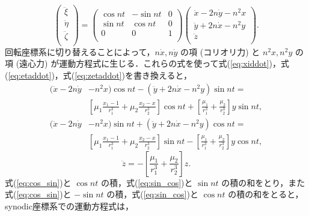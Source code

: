 \documentclass[11pt,a4paper,oneside,onecolumn]{jreport}
\begin{document}
\begin{equation}
\begin{pmatrix}
\ddot{\xi}\\
\ddot{\eta}\\
\ddot{\zeta}\\
\end{pmatrix}
= 
\begin{pmatrix}
\cos nt & - \sin nt & 0\\
\sin nt & \cos nt & 0\\
0 & 0 & 1\\
\end{pmatrix}
\begin{pmatrix}
\ddot{x} - 2 n \dot{y} - n^2 x\\
\ddot{y} + 2 n \dot{x} - n^2 y\\
\ddot{z}\\
\end{pmatrix}. \label{eq:xiddot_etaddot_zetaddot}
\end{equation}
回転座標系に切り替えることによって，$n \dot{x}, n \dot{y}$ の項 (コリオリ力) と $n^2 x, n^2 y$ の項 (遠心力) が運動方程式に生じる．これらの式を使って式(\ref{eq:xiddot})，式(\ref{eq:etaddot})，式(\ref{eq:zetaddot})を書き換えると，
\begin{equation}
\begin{split}
(\ddot{x} - 2 n \dot{y} & - n^2 x) \cos nt - (\ddot{y} + 2 n \dot{x} - n^2 y) \sin nt =\\
& \left[ \mu_1 \frac{x_1 - 1}{r_1^3} + \mu_2 \frac{x_2 - x}{r_2^3} \right] \cos nt + \left[ \frac{\mu_1}{r_1^3} + \frac{\mu_2}{r_2^3} \right] y \sin nt, \label{eq:cos_sin}
\end{split}
\end{equation}
\begin{equation}
\begin{split}
(\ddot{x} - 2 n \dot{y} & - n^2 x) \sin nt + (\ddot{y} + 2 n \dot{x} - n^2 y) \cos nt =\\
& \left[ \mu_1 \frac{x_1 - 1}{r_1^3} + \mu_2 \frac{x_2 - x}{r_2^3} \right] \sin nt - \left[ \frac{\mu_1}{r_1^3} + \frac{\mu_2}{r_2^3} \right] y \cos nt, \label{eq:sin_cos}
\end{split}
\end{equation}
\begin{equation}
\ddot{z} = - \left[ \frac{\mu_1}{r_1^3} + \frac{\mu_2}{r_2^3} \right] z.
\end{equation}
式(\ref{eq:cos_sin})と $\cos nt$ の積，式(\ref{eq:sin_cos})と $\sin nt$ の積の和をとり，また式(\ref{eq:cos_sin})と $- \sin nt$ の積，式(\ref{eq:sin_cos})と $\cos nt$ の積の和をとると，synodic座標系での運動方程式は，
\end{document}
